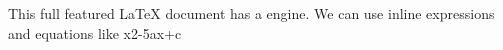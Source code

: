\markdownRendererUlBeginTight
\markdownRendererUlItem This full featured LaTeX document has a  engine.\markdownRendererUlItemEnd 
\markdownRendererUlItem We can use \markdownRendererDollarSign{}inline\markdownRendererDollarSign{} expressions and equations like \markdownRendererDollarSign{}x\markdownRendererCircumflex{}2-5ax+c\markdownRendererDollarSign{}\markdownRendererUlItemEnd 
\markdownRendererUlEndTight \relax